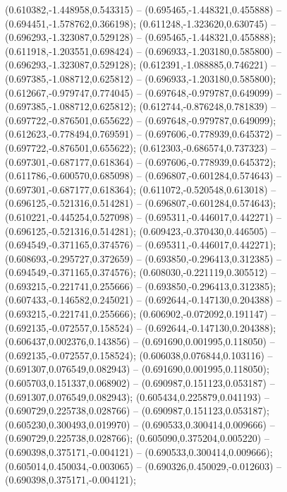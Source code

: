  (0.610382,-1.448958,0.543315) -- (0.695465,-1.448321,0.455888) -- (0.694451,-1.578762,0.366198);
 (0.611248,-1.323620,0.630745) -- (0.696293,-1.323087,0.529128) -- (0.695465,-1.448321,0.455888);
 (0.611918,-1.203551,0.698424) -- (0.696933,-1.203180,0.585800) -- (0.696293,-1.323087,0.529128);
 (0.612391,-1.088885,0.746221) -- (0.697385,-1.088712,0.625812) -- (0.696933,-1.203180,0.585800);
 (0.612667,-0.979747,0.774045) -- (0.697648,-0.979787,0.649099) -- (0.697385,-1.088712,0.625812);
 (0.612744,-0.876248,0.781839) -- (0.697722,-0.876501,0.655622) -- (0.697648,-0.979787,0.649099);
 (0.612623,-0.778494,0.769591) -- (0.697606,-0.778939,0.645372) -- (0.697722,-0.876501,0.655622);
 (0.612303,-0.686574,0.737323) -- (0.697301,-0.687177,0.618364) -- (0.697606,-0.778939,0.645372);
 (0.611786,-0.600570,0.685098) -- (0.696807,-0.601284,0.574643) -- (0.697301,-0.687177,0.618364);
 (0.611072,-0.520548,0.613018) -- (0.696125,-0.521316,0.514281) -- (0.696807,-0.601284,0.574643);
 (0.610221,-0.445254,0.527098) -- (0.695311,-0.446017,0.442271) -- (0.696125,-0.521316,0.514281);
 (0.609423,-0.370430,0.446505) -- (0.694549,-0.371165,0.374576) -- (0.695311,-0.446017,0.442271);
 (0.608693,-0.295727,0.372659) -- (0.693850,-0.296413,0.312385) -- (0.694549,-0.371165,0.374576);
 (0.608030,-0.221119,0.305512) -- (0.693215,-0.221741,0.255666) -- (0.693850,-0.296413,0.312385);
 (0.607433,-0.146582,0.245021) -- (0.692644,-0.147130,0.204388) -- (0.693215,-0.221741,0.255666);
 (0.606902,-0.072092,0.191147) -- (0.692135,-0.072557,0.158524) -- (0.692644,-0.147130,0.204388);
 (0.606437,0.002376,0.143856) -- (0.691690,0.001995,0.118050) -- (0.692135,-0.072557,0.158524);
 (0.606038,0.076844,0.103116) -- (0.691307,0.076549,0.082943) -- (0.691690,0.001995,0.118050);
 (0.605703,0.151337,0.068902) -- (0.690987,0.151123,0.053187) -- (0.691307,0.076549,0.082943);
 (0.605434,0.225879,0.041193) -- (0.690729,0.225738,0.028766) -- (0.690987,0.151123,0.053187);
 (0.605230,0.300493,0.019970) -- (0.690533,0.300414,0.009666) -- (0.690729,0.225738,0.028766);
 (0.605090,0.375204,0.005220) -- (0.690398,0.375171,-0.004121) -- (0.690533,0.300414,0.009666);
 (0.605014,0.450034,-0.003065) -- (0.690326,0.450029,-0.012603) -- (0.690398,0.375171,-0.004121);
